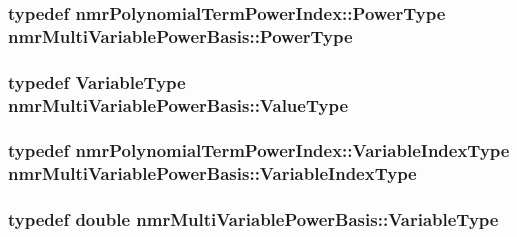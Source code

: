 \hypertarget{classnmr_multi_variable_power_basis_a2cb67df83e9fcac213848fa7a7295fcc}{
\subsubsection[{Power\-Type}]{\setlength{\rightskip}{0pt plus 5cm}typedef {\bf nmr\-Polynomial\-Term\-Power\-Index\-::\-Power\-Type} {\bf nmr\-Multi\-Variable\-Power\-Basis\-::\-Power\-Type}}}\label{classnmr_multi_variable_power_basis_a2cb67df83e9fcac213848fa7a7295fcc}
\hypertarget{classnmr_multi_variable_power_basis_af4a74a68c8bac235645e3f37f2f464e5}{
\subsubsection[{Value\-Type}]{\setlength{\rightskip}{0pt plus 5cm}typedef {\bf Variable\-Type} {\bf nmr\-Multi\-Variable\-Power\-Basis\-::\-Value\-Type}}}\label{classnmr_multi_variable_power_basis_af4a74a68c8bac235645e3f37f2f464e5}
\hypertarget{classnmr_multi_variable_power_basis_ae125326a623043fcfd020aeeefd1cce6}{
\subsubsection[{Variable\-Index\-Type}]{\setlength{\rightskip}{0pt plus 5cm}typedef {\bf nmr\-Polynomial\-Term\-Power\-Index\-::\-Variable\-Index\-Type} {\bf nmr\-Multi\-Variable\-Power\-Basis\-::\-Variable\-Index\-Type}}}\label{classnmr_multi_variable_power_basis_ae125326a623043fcfd020aeeefd1cce6}
\hypertarget{classnmr_multi_variable_power_basis_a7089007a79cce8d2eb3672e2d61af06c}{
\subsubsection[{Variable\-Type}]{\setlength{\rightskip}{0pt plus 5cm}typedef double {\bf nmr\-Multi\-Variable\-Power\-Basis\-::\-Variable\-Type}}}\label{classnmr_multi_variable_power_basis_a7089007a79cce8d2eb3672e2d61af06c}


